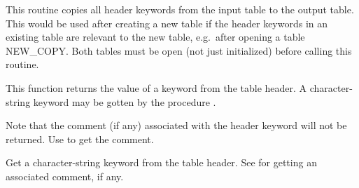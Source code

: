 \begin{callseq}
\end{callseq}

This routine copies all header keywords
from the input table to the output table.
This would be used after creating a new table
if the header keywords in an existing table are relevant to the new table,
e.g.~after opening a table NEW\_COPY.
Both tables must be open (not just initialized) before calling this routine.

\callseqtable

\begin{callseq}
\end{callseq}

This function returns the value of a keyword from the table header.
A character-string keyword may be gotten by the procedure .

Note that the comment (if any) associated with the header keyword
will not be returned.
Use  to get the comment.

\callseqfcn

\begin{callseq}
\end{callseq}

Get a character-string keyword from the table header.
See  for getting an associated comment, if any.

\callseqtable

\begin{callseq}
\end{callseq}

